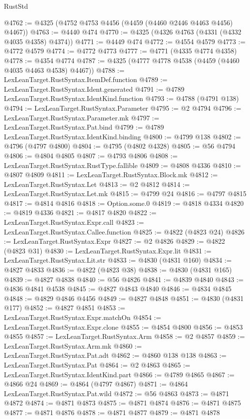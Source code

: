\begin{lexlean}{RustStd}
\begin{coremodule}
@4762 := @4325 (@4752 @4753 @4456 (@4459 (@4460 @2446 @4463 @4456) @4467))
@4763 := @4440 @474
@4770 := @4325 (@4326 @4763 (@4331 (@4332 @4035 @4358) @4374))
@4771 := @4449 @474
@4772 := @4554 @4579
@4773 := @4772 @4579
@4774 := @4772 @4773
@4777 := @4771 (@4335 @4774 @4358)
@4778 := @4354 @4774
@4787 := @4325 (@4777 @4778 @4538 (@4459 (@4460 @4035 @4463 @4538) @4467))
@4788 := LexLeanTarget.RustSyntax.ItemDef.function
@4789 := LexLeanTarget.RustSyntax.Ident.generated
@4791 := @4789 LexLeanTarget.RustSyntax.IdentKind.function
@4793 := @4788 (@4791 @138)
@4794 := LexLeanTarget.RustSyntax.Parameter
@4795 := @2 @4794
@4796 := LexLeanTarget.RustSyntax.Parameter.mk
@4797 := LexLeanTarget.RustSyntax.Pat.bind
@4799 := @4789 LexLeanTarget.RustSyntax.IdentKind.binding
@4800 := @4799 @138
@4802 := @4796 (@4797 @4800)
@4804 := @4795 (@4802 @4328)
@4805 := @56 @4794
@4806 := @4804 @4805
@4807 := @4793 @4806
@4808 := LexLeanTarget.RustSyntax.RustType.fallible
@4809 := @4808 @4336
@4810 := @4807 @4809
@4811 := LexLeanTarget.RustSyntax.Block.mk
@4812 := LexLeanTarget.RustSyntax.Let
@4813 := @2 @4812
@4814 := LexLeanTarget.RustSyntax.Let.mk
@4815 := @4799 @24
@4816 := @4797 @4815
@4817 := @4814 @4816
@4818 := Option.some.{0}
@4819 := @4818 @4334
@4820 := @4819 @4336
@4821 := @4817 @4820
@4822 := LexLeanTarget.RustSyntax.Expr.call
@4823 := LexLeanTarget.RustSyntax.Callee.function
@4825 := @4822 (@4823 @24)
@4826 := LexLeanTarget.RustSyntax.Expr
@4827 := @2 @4826
@4829 := @4822 (@4823 @31)
@4830 := LexLeanTarget.RustSyntax.Expr.lit
@4831 := LexLeanTarget.RustSyntax.Lit.str
@4833 := @4830 (@4831 @160)
@4834 := @4827 @4833
@4836 := @4822 (@4823 @38)
@4838 := @4830 (@4831 @165)
@4839 := @4827 @4838
@4840 := @56 @4826
@4841 := @4839 @4840
@4843 := @4836 @4841 @4538
@4845 := @4827 @4843 @4840
@4846 := @4834 @4845
@4848 := @4829 @4846 @4456
@4849 := @4827 @4848
@4851 := @4830 (@4831 @177)
@4852 := @4827 @4851
@4853 := LexLeanTarget.RustSyntax.Expr.matchOn
@4854 := LexLeanTarget.RustSyntax.Expr.clone
@4855 := @4854 @4800
@4856 := @4853 @4855
@4857 := LexLeanTarget.RustSyntax.Arm
@4858 := @2 @4857
@4859 := LexLeanTarget.RustSyntax.Arm.mk
@4860 := LexLeanTarget.RustSyntax.Pat.adt
@4862 := @4860 @138 @138
@4863 := LexLeanTarget.RustSyntax.Pat
@4864 := @2 @4863
@4865 := LexLeanTarget.RustSyntax.IdentKind.part
@4866 := @4789 @4865
@4867 := @4866 @24
@4869 := @4864 (@4797 @4867)
@4871 := @4864 LexLeanTarget.RustSyntax.Pat.wild
@4872 := @56 @4863
@4873 := @4871 @4872
@4874 := @4871 @4873
@4875 := @4871 @4874
@4876 := @4871 @4875
@4877 := @4871 @4876
@4878 := @4871 @4877
@4879 := @4871 @4878

\end{coremodule}
\end{lexlean}
